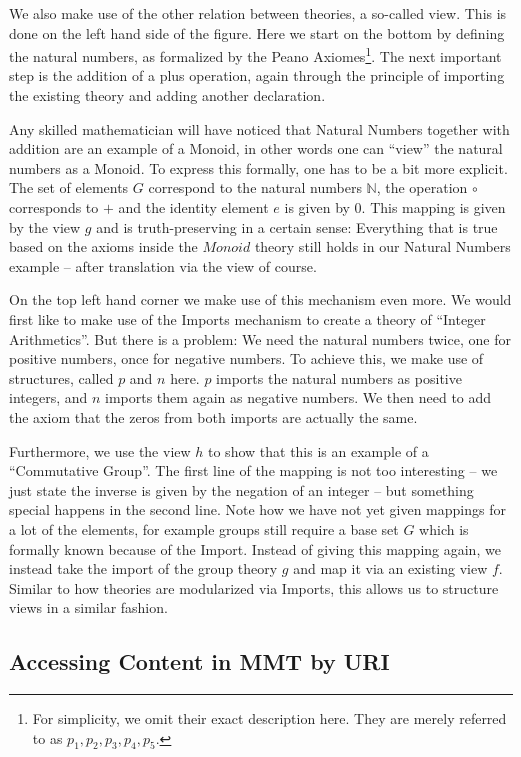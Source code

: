 We also make use of the other relation between theories, a so-called view.
This is done on the left hand side of the figure.
Here we start on the bottom by defining the natural numbers, as formalized by the Peano Axiomes\footnote{
For simplicity, we omit their exact description here.
They are merely referred to as $p_1, p_2, p_3, p_4, p_5$. }.
The next important step is the addition of a plus operation, again through the principle of importing the existing theory and adding another declaration.

Any skilled mathematician will have noticed that Natural Numbers together with addition are an example of a Monoid, in other words one can ``view'' the natural numbers as a Monoid.
To express this formally, one has to be a bit more explicit.
The set of elements $G$ correspond to the natural numbers $\mathbb{N}$, the operation $\circ$ corresponds to $+$ and the identity element $e$ is given by $0$.
This mapping is given by the view $g$ and is truth-preserving in a certain sense: Everything that is true based on the axioms inside the $Monoid$ theory still holds in our Natural Numbers example -- after translation via the view of course.

On the top left hand corner we make use of this mechanism even more. 
We would first like to make use of the Imports mechanism to create a theory of ``Integer Arithmetics''. 
But there is a problem: We need the natural numbers twice, one for positive numbers, once for negative numbers. 
To achieve this, we make use of structures, called $p$ and $n$ here. 
$p$ imports the natural numbers as positive integers, and $n$ imports them again as negative numbers. 
We then need to add the axiom that the zeros from both imports are actually the same. 

Furthermore, we use the view $h$ to show that this is an example of a ``Commutative Group''. 
The first line of the mapping is not too interesting -- we just state the inverse is given by the negation of an integer -- but something special happens in the second line.
Note how we have not yet given mappings for a lot of the elements, for example groups still require a base set $G$ which is formally known because of the Import.
Instead of giving this mapping again, we instead take the import of the group theory $g$ and map it via an existing view $f$.
Similar to how theories are modularized via Imports, this allows us to structure views in a similar fashion. 

\subsection{Accessing Content in MMT by URI}\label{sec:name}

